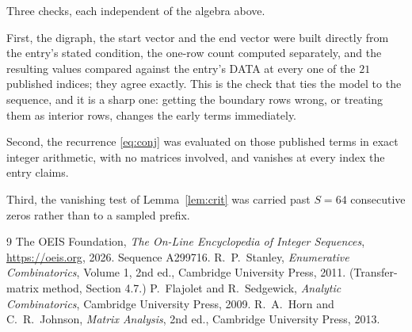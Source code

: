\documentclass[11pt,a4paper]{article}
\theoremstyle{plain}
\theoremstyle{definition}
\begin{document}
Three checks, each independent of the algebra above.

First, the digraph, the start vector and the end vector were built directly from the
entry's stated condition, the one-row count computed separately, and the resulting values
compared against the entry's DATA at every one of the $21$ published indices; they
agree exactly. This is the check that ties the model to the sequence, and it is a sharp one:
getting the boundary rows wrong, or treating them as interior rows, changes the early terms
immediately.

Second, the recurrence \eqref{eq:conj} was evaluated on those published terms in exact
integer arithmetic, with no matrices involved, and vanishes at every index the entry claims.

Third, the vanishing test of Lemma~\ref{lem:crit} was carried past $S=64$ consecutive
zeros rather than to a sampled prefix.

\begin{thebibliography}{9}
 The OEIS Foundation, \emph{The On-Line Encyclopedia of Integer
Sequences}, \url{https://oeis.org}, 2026. Sequence A299716.
 R.~P.~Stanley, \emph{Enumerative Combinatorics}, Volume 1, 2nd ed.,
Cambridge University Press, 2011. (Transfer-matrix method, Section 4.7.)
 P.~Flajolet and R.~Sedgewick, \emph{Analytic Combinatorics}, Cambridge
University Press, 2009.
 R.~A.~Horn and C.~R.~Johnson, \emph{Matrix Analysis}, 2nd ed., Cambridge
University Press, 2013.
\end{thebibliography}
\end{document}
